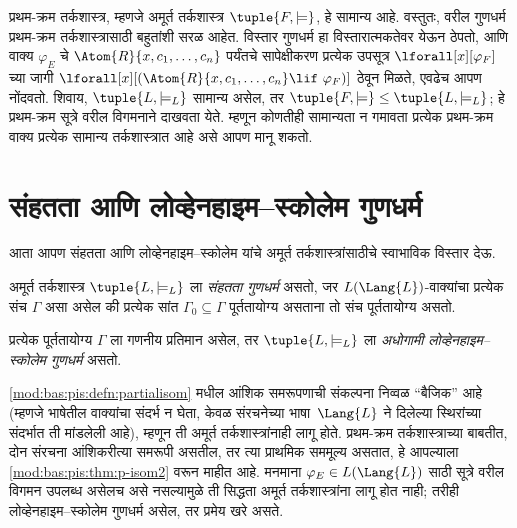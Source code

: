 \begin{rem}
  प्रथम-क्रम तर्कशास्त्र, म्हणजे अमूर्त तर्कशास्त्र $\tuple{F,
  \models}$, हे सामान्य आहे. वस्तुतः, वरील गुणधर्म प्रथम-क्रम
  तर्कशास्त्रासाठी बहुतांशी सरळ आहेत. विस्तार गुणधर्म हा
  विस्तारात्मकतेवर येऊन ठेपतो, आणि वाक्य $\varphi_{E}$ चे
  $\Atom{R}{x, c_1, \dots, c_n}$ पर्यंतचे सापेक्षीकरण प्रत्येक
  उपसूत्र $\lforall[x][\varphi_{F}]$ च्या जागी
  $\lforall[x][(\Atom{R}{x, c_1, \dots, c_n} \lif \ \varphi_{F})]$ ठेवून
  मिळते, एवढेच आपण नोंदवतो. शिवाय, $\tuple{L, \models_L}$ सामान्य
  असेल, तर $\tuple{F, \models} \leq \tuple{L, \models_{L}}$; हे
  प्रथम-क्रम सूत्रे वरील विगमनाने दाखवता येते. म्हणून कोणतीही
  सामान्यता न गमावता प्रत्येक प्रथम-क्रम वाक्य प्रत्येक सामान्य
  तर्कशास्त्रात आहे असे आपण मानू शकतो.
\end{rem}












\section{संहतता आणि लोव्हेनहाइम--स्कोलेम गुणधर्म}\label{mod:lin:lsp:sec}

आता आपण संहतता आणि लोव्हेनहाइम--स्कोलेम यांचे अमूर्त तर्कशास्त्रांसाठीचे
स्वाभाविक विस्तार देऊ.

\begin{defn}
अमूर्त तर्कशास्त्र $\tuple{L, \models_L}$ ला \emph{संहतता गुणधर्म}
असतो, जर $L(\Lang{L})$-वाक्यांचा प्रत्येक संच $\Gamma$ असा
असेल की प्रत्येक सांत $\Gamma_0 \subseteq \Gamma$ पूर्ततायोग्य असताना
तो संच पूर्ततायोग्य असतो.
\end{defn}

\begin{defn}
प्रत्येक पूर्ततायोग्य $\Gamma$ ला गणनीय प्रतिमान असेल, तर
$\tuple{L, \models_L}$ ला \emph{अधोगामी लोव्हेनहाइम--स्कोलेम गुणधर्म}
असतो.
\end{defn}


\ref{mod:bas:pis:defn:partialisom} मधील आंशिक समरूपणाची संकल्पना निव्वळ
``बैजिक'' आहे (म्हणजे भाषेतील वाक्यांचा संदर्भ न घेता, केवळ
संरचनेच्या भाषा~$\Lang{L}$ ने दिलेल्या स्थिरांच्या
संदर्भात ती मांडलेली आहे), म्हणून ती अमूर्त तर्कशास्त्रांनाही लागू होते.
प्रथम-क्रम तर्कशास्त्राच्या बाबतीत, दोन संरचना आंशिकरीत्या समरूपी
असतील, तर त्या प्राथमिक सममूल्य असतात, हे आपल्याला
\ref{mod:bas:pis:thm:p-isom2} वरून माहीत आहे. मनमाना $\varphi_{E} \in
L(\Lang{L})$ साठी सूत्रे वरील विगमन उपलब्ध असेलच असे नसल्यामुळे ती
सिद्धता अमूर्त तर्कशास्त्रांना लागू होत नाही; तरीही लोव्हेनहाइम--स्कोलेम
गुणधर्म असेल, तर प्रमेय खरे असते.

